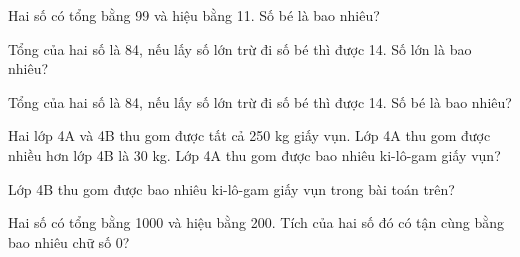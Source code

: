 \begin{ex}
Hai số có tổng bằng 99 và hiệu bằng 11. Số bé là bao nhiêu?
\end{ex}

\begin{ex}
Tổng của hai số là 84, nếu lấy số lớn trừ đi số bé thì được 14. Số lớn là bao nhiêu?
\end{ex}

\begin{ex}
Tổng của hai số là 84, nếu lấy số lớn trừ đi số bé thì được 14. Số bé là bao nhiêu?
\end{ex}

\begin{ex}
Hai lớp 4A và 4B thu gom được tất cả 250 kg giấy vụn. Lớp 4A thu gom được nhiều hơn lớp 4B là 30 kg. Lớp 4A thu gom được bao nhiêu ki-lô-gam giấy vụn?
\end{ex}

\begin{ex}
Lớp 4B thu gom được bao nhiêu ki-lô-gam giấy vụn trong bài toán trên?
\end{ex}

\begin{ex}
Hai số có tổng bằng 1000 và hiệu bằng 200. Tích của hai số đó có tận cùng bằng bao nhiêu chữ số 0?
\end{ex}
